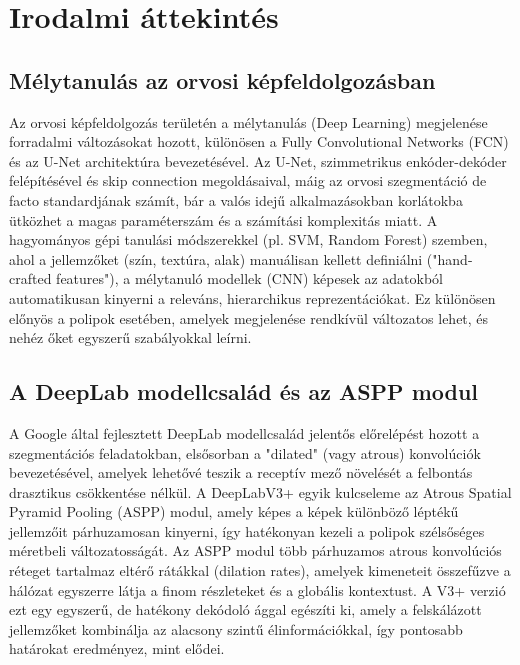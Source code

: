 \documentclass[12pt, a4paper]{report}
\begin{document}
\section{Irodalmi áttekintés}

\subsection{Mélytanulás az orvosi képfeldolgozásban}
Az orvosi képfeldolgozás területén a mélytanulás (Deep Learning) megjelenése forradalmi változásokat hozott, különösen a Fully Convolutional Networks (FCN) és az U-Net architektúra bevezetésével. Az U-Net, szimmetrikus enkóder-dekóder felépítésével és skip connection megoldásaival, máig az orvosi szegmentáció de facto standardjának számít, bár a valós idejű alkalmazásokban korlátokba ütközhet a magas paraméterszám és a számítási komplexitás miatt. A hagyományos gépi tanulási módszerekkel (pl. SVM, Random Forest) szemben, ahol a jellemzőket (szín, textúra, alak) manuálisan kellett definiálni ("hand-crafted features"), a mélytanuló modellek (CNN) képesek az adatokból automatikusan kinyerni a releváns, hierarchikus reprezentációkat. Ez különösen előnyös a polipok esetében, amelyek megjelenése rendkívül változatos lehet, és nehéz őket egyszerű szabályokkal leírni.

\subsection{A DeepLab modellcsalád és az ASPP modul}
A Google által fejlesztett DeepLab modellcsalád jelentős előrelépést hozott a szegmentációs feladatokban, elsősorban a "dilated" (vagy atrous) konvolúciók bevezetésével, amelyek lehetővé teszik a receptív mező növelését a felbontás drasztikus csökkentése nélkül. A DeepLabV3+ egyik kulcseleme az Atrous Spatial Pyramid Pooling (ASPP) modul, amely képes a képek különböző léptékű jellemzőit párhuzamosan kinyerni, így hatékonyan kezeli a polipok szélsőséges méretbeli változatosságát. Az ASPP modul több párhuzamos atrous konvolúciós réteget tartalmaz eltérő rátákkal (dilation rates), amelyek kimeneteit összefűzve a hálózat egyszerre látja a finom részleteket és a globális kontextust. A V3+ verzió ezt egy egyszerű, de hatékony dekódoló ággal egészíti ki, amely a felskálázott jellemzőket kombinálja az alacsony szintű élinformációkkal, így pontosabb határokat eredményez, mint elődei.
\end{document}
